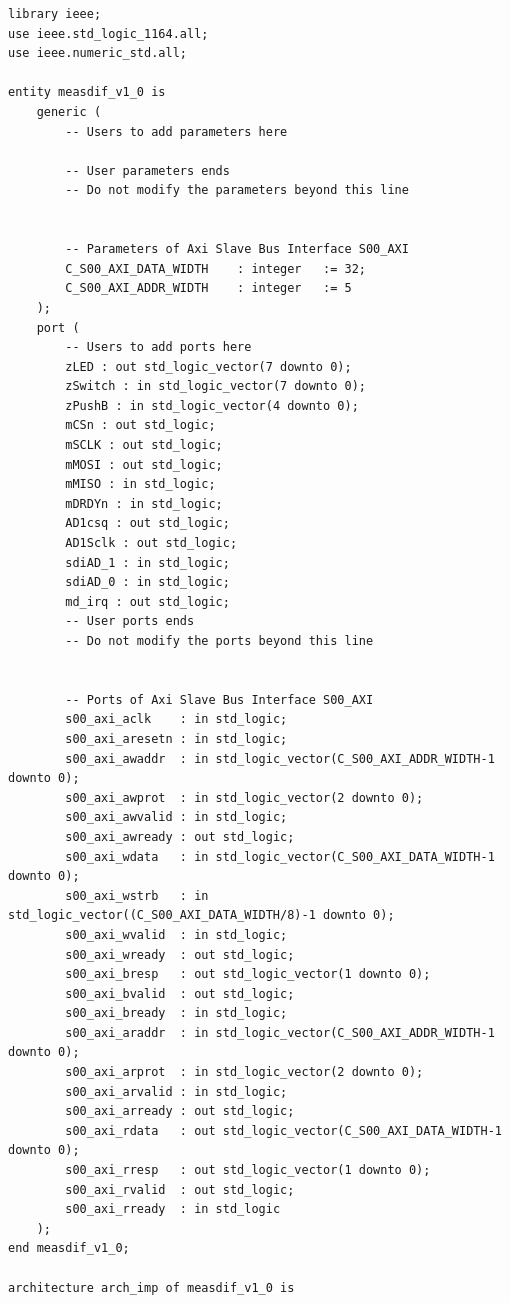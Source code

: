 \begin{verbatim}
library ieee;
use ieee.std_logic_1164.all;
use ieee.numeric_std.all;

entity measdif_v1_0 is
	generic (
		-- Users to add parameters here

		-- User parameters ends
		-- Do not modify the parameters beyond this line


		-- Parameters of Axi Slave Bus Interface S00_AXI
		C_S00_AXI_DATA_WIDTH	: integer	:= 32;
		C_S00_AXI_ADDR_WIDTH	: integer	:= 5
	);
	port (
		-- Users to add ports here
        zLED : out std_logic_vector(7 downto 0);
        zSwitch : in std_logic_vector(7 downto 0);
        zPushB : in std_logic_vector(4 downto 0);
        mCSn : out std_logic;
        mSCLK : out std_logic;
        mMOSI : out std_logic;
        mMISO : in std_logic;
        mDRDYn : in std_logic;
        AD1csq : out std_logic;
        AD1Sclk : out std_logic;
        sdiAD_1 : in std_logic;
        sdiAD_0 : in std_logic;
        md_irq : out std_logic;
		-- User ports ends
		-- Do not modify the ports beyond this line


		-- Ports of Axi Slave Bus Interface S00_AXI
		s00_axi_aclk	: in std_logic;
		s00_axi_aresetn	: in std_logic;
		s00_axi_awaddr	: in std_logic_vector(C_S00_AXI_ADDR_WIDTH-1 downto 0);
		s00_axi_awprot	: in std_logic_vector(2 downto 0);
		s00_axi_awvalid	: in std_logic;
		s00_axi_awready	: out std_logic;
		s00_axi_wdata	: in std_logic_vector(C_S00_AXI_DATA_WIDTH-1 downto 0);
		s00_axi_wstrb	: in std_logic_vector((C_S00_AXI_DATA_WIDTH/8)-1 downto 0);
		s00_axi_wvalid	: in std_logic;
		s00_axi_wready	: out std_logic;
		s00_axi_bresp	: out std_logic_vector(1 downto 0);
		s00_axi_bvalid	: out std_logic;
		s00_axi_bready	: in std_logic;
		s00_axi_araddr	: in std_logic_vector(C_S00_AXI_ADDR_WIDTH-1 downto 0);
		s00_axi_arprot	: in std_logic_vector(2 downto 0);
		s00_axi_arvalid	: in std_logic;
		s00_axi_arready	: out std_logic;
		s00_axi_rdata	: out std_logic_vector(C_S00_AXI_DATA_WIDTH-1 downto 0);
		s00_axi_rresp	: out std_logic_vector(1 downto 0);
		s00_axi_rvalid	: out std_logic;
		s00_axi_rready	: in std_logic
	);
end measdif_v1_0;

architecture arch_imp of measdif_v1_0 is


\end{verbatim}

